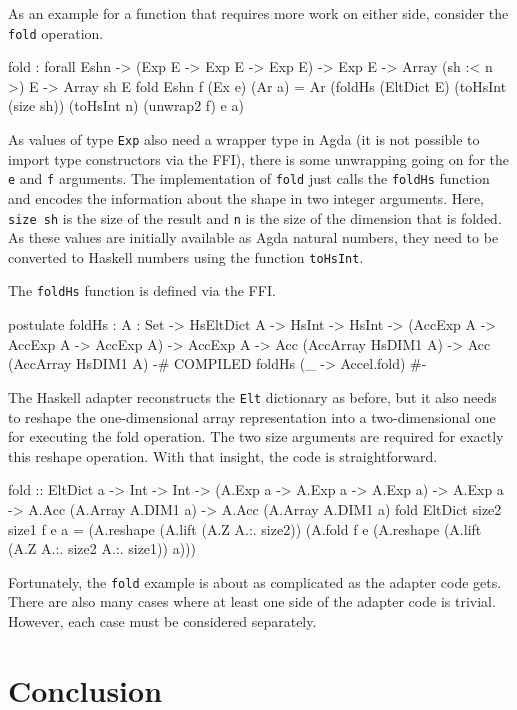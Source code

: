 \documentclass{llncs}
\begin{document}
As an example for a function that requires more work on either side,
consider the \texttt{fold} operation. 
\begin{code}
fold : forall {E}{sh}{n}
     -> (Exp E -> Exp E -> Exp E)
     -> Exp E
     -> Array (sh :< n >) E
     -> Array sh E
fold {E}{sh}{n} f (Ex e) (Ar a) =
  Ar (foldHs (EltDict E) (toHsInt (size sh)) (toHsInt n)
             (unwrap2 f) e a)
\end{code}
As values of type \texttt{Exp} also need a wrapper type in Agda (it is
not possible to import type constructors via the FFI), there is some
unwrapping going on for the \texttt{e} and \texttt{f}
arguments. The implementation of \texttt{fold} just calls the
\texttt{foldHs} function and encodes the information about the shape
in two integer arguments. Here, \texttt{size sh} is the size of the
result and \texttt{n} is the size of the dimension that is folded. As
these values are initially available as Agda natural numbers, they need to
be converted to Haskell numbers using the function \texttt{toHsInt}.

The \texttt{foldHs} function is defined via the FFI.
\begin{code}
postulate
  foldHs : {A : Set}
          -> HsEltDict A
          -> HsInt
          -> HsInt
          -> (AccExp A -> AccExp A -> AccExp A)
          -> AccExp A
          -> Acc (AccArray HsDIM1 A)
          -> Acc (AccArray HsDIM1 A)
  {-# COMPILED foldHs      (\_ -> Accel.fold) #-}
\end{code}
The Haskell adapter reconstructs the \texttt{Elt} dictionary
as before, but it also needs to reshape the one-dimensional array
representation into a two-dimensional one for executing the fold
operation. The two size arguments are required for exactly this
reshape operation. With that insight, the code is straightforward.
\begin{hcode}
fold :: EltDict a
     -> Int -> Int
     -> (A.Exp a -> A.Exp a -> A.Exp a)
     -> A.Exp a
     -> A.Acc (A.Array A.DIM1 a)
     -> A.Acc (A.Array A.DIM1 a)
fold EltDict size2 size1 f e a =
     (A.reshape (A.lift (A.Z A.:. size2))
      (A.fold f e
       (A.reshape (A.lift (A.Z A.:. size2 A.:. size1)) a)))
\end{hcode}

Fortunately, the \texttt{fold} example is about as complicated as the
adapter code gets. There are also many cases where at least one side
of the adapter code is trivial. However, each case must be considered
separately. 

\section{Conclusion}
\label{sec:conclusion}
\end{document}
